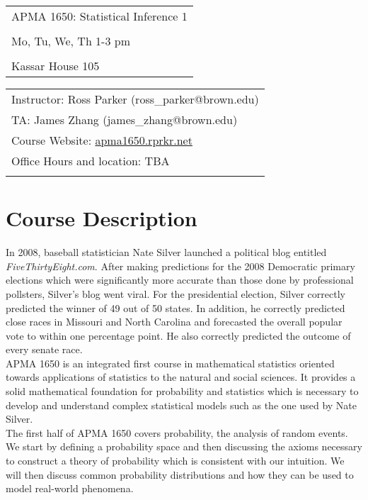 \documentclass[11pt]{article}
\begin{document}
\begin{tabular}{ l }
 \LARGE APMA 1650: Statistical Inference 1 \\\\
 \LARGE Mo, Tu, We, Th 1-3 pm \\\\
 \LARGE Kassar House 105 
\end{tabular}
\vspace{5mm}

\begin{tabular}{ l }
   \large Instructor: Ross Parker (ross\_parker@brown.edu) \\
   \large TA: James Zhang (james\_zhang@brown.edu) \\
   \large Course Website: \url{apma1650.rprkr.net} \\
   \large Office Hours and location: TBA \\
   \large  \\
\end{tabular}

\section*{Course Description}
In 2008, baseball statistician Nate Silver launched a political blog entitled \emph{FiveThirtyEight.com}. After making predictions for the 2008 Democratic primary elections which were significantly more accurate than those done by professional pollsters, Silver's blog went viral. For the presidential election, Silver correctly predicted the winner of 49 out of 50 states. In addition, he correctly predicted close races in Missouri and North Carolina and forecasted the overall popular vote to within one percentage point. He also correctly predicted the outcome of every senate race.\\

APMA 1650 is an integrated first course in mathematical statistics oriented towards applications of statistics to the natural and social sciences. It provides a solid mathematical foundation for probability and statistics which is necessary to develop and understand complex statistical models such as the one used by Nate Silver.\\

The first half of APMA 1650 covers probability, the analysis of random events. We start by defining a probability space and then discussing the axioms necessary to construct a theory of probability which is consistent with our intuition. We will then discuss common probability distributions and how they can be used to model real-world phenomena.\\
\end{document}
